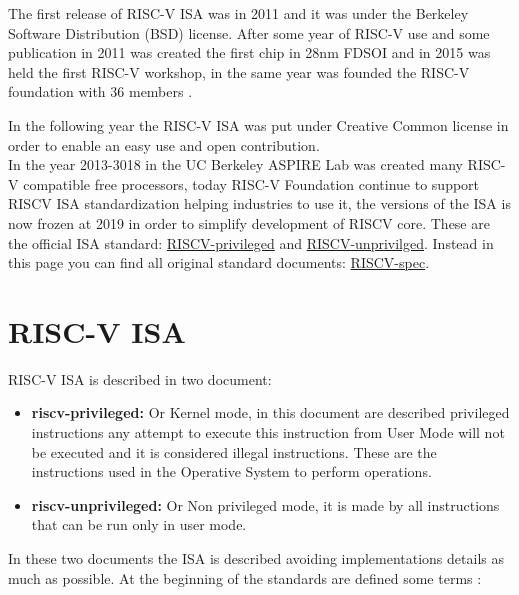 {{	    The first release of RISC-V ISA was in 2011 and it was under the Berkeley Software Distribution (BSD) license. 
	    After some year of RISC-V use and some publication  in 2011 was created the first chip in 28nm FDSOI and in 2015 was held the first RISC-V workshop, in the same year was founded the RISC-V foundation with 36 members .
	    
	    In the following year the RISC-V ISA was put under Creative Common license in order to enable an easy use and open contribution.\\
	    
	    In the year 2013-3018 in the UC Berkeley ASPIRE Lab was created many RISC-V compatible free processors, today RISC-V Foundation continue to support RISCV ISA standardization helping industries to use it, the versions of the ISA is now frozen at 2019  in order to simplify development of RISCV core. 
	    These are the official ISA  standard: \href{https://github.com/riscv/riscv-isa-manual/releases/download/Ratified-IMFDQC-and-Priv-v1.11/riscv-privileged-20190608.pdf}{RISCV-privileged} and  \href{https://github.com/riscv/riscv-isa-manual/releases/download/Ratified-IMAFDQC/riscv-spec-20191213.pdf}{RISCV-unprivilged}. 
	    Instead in this page you can find all original standard documents: \href{https://riscv.org/technical/specifications/}{RISCV-spec}.
	}%

	\section{RISC-V ISA}{
	    RISC-V ISA is described in two document:
	    \begin{itemize}
	        \item \textbf{riscv-privileged:} Or Kernel mode, in this document are described privileged  instructions any attempt to execute this instruction from User Mode will not be executed and it is considered illegal instructions. These are the instructions used in the Operative System to perform operations.
	        \item \textbf{riscv-unprivileged:} Or Non privileged mode, it is made by all instructions that can be run only in user mode.
	    \end{itemize}
	    
	    In these two documents the ISA is described avoiding implementations details as much as possible. At the beginning of the standards are defined some terms :
	    
}}
